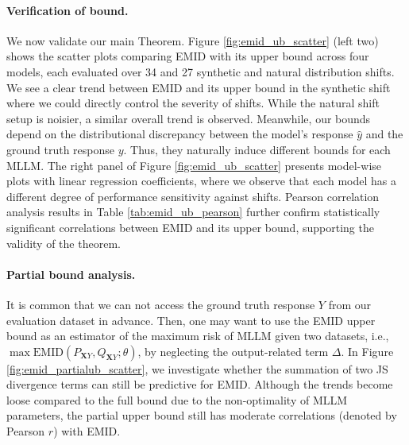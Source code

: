 
\paragraph{Verification of bound.} We now validate our main Theorem. Figure \ref{fig:emid_ub_scatter} (left two) shows the scatter plots comparing EMID with its upper bound across four models, each evaluated over 34 and 27 synthetic and natural distribution shifts. We see a clear trend between EMID and its upper bound in the synthetic shift where we could directly control the severity of shifts. While the natural shift setup is noisier, a similar overall trend is observed. Meanwhile, our bounds depend on the distributional discrepancy between the model's response $\hat{y}$ and the ground truth response $y$. Thus, they naturally induce different bounds for each MLLM. The right panel of Figure \ref{fig:emid_ub_scatter} presents model-wise plots with linear regression coefficients, where we observe that each model has a different degree of performance sensitivity against shifts. Pearson correlation analysis results in Table \ref{tab:emid_ub_pearson} further confirm statistically significant correlations between EMID and its upper bound, supporting the validity of the theorem.

\paragraph{Partial bound analysis.} It is common that we can not access the ground truth response $Y$ from our evaluation dataset in advance. Then, one may want to use the EMID upper bound as an estimator of the maximum risk of MLLM given two datasets, i.e., $\max \text{EMID}(P_{\mathbf{X}Y},Q_{\mathbf{X}Y};\theta)$, by neglecting the output-related term $\Delta$. In Figure \ref{fig:emid_partialub_scatter}, we investigate whether the summation of two JS divergence terms can still be predictive for EMID. Although the trends become loose compared to the full bound due to the non-optimality of MLLM parameters, the partial upper bound still has moderate correlations (denoted by Pearson $r$) with EMID.
